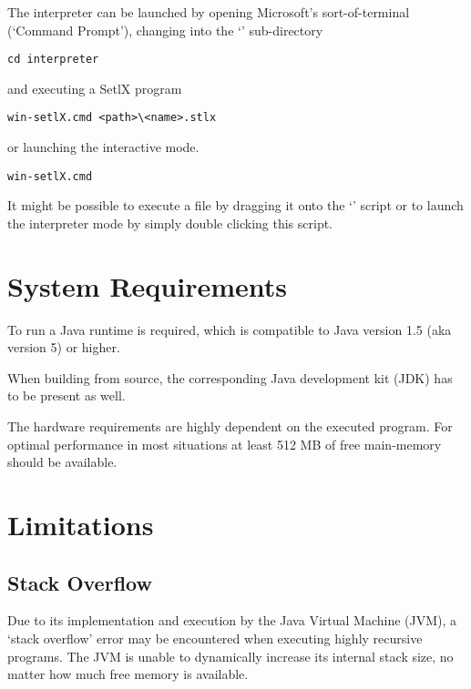 The \setlX{} interpreter can be launched by opening Microsoft's sort-of-terminal (`Command Prompt'), changing into the `' sub-directory

\begin{lstlisting}[frame=none,numbers=none]
cd interpreter
\end{lstlisting}

and executing a SetlX program

\begin{lstlisting}[frame=none,numbers=none]
win-setlX.cmd <path>\<name>.stlx
\end{lstlisting}

or launching the interactive mode.

\begin{lstlisting}[frame=none,numbers=none]
win-setlX.cmd
\end{lstlisting}

It might be possible to execute a \SetlX{} file by dragging it onto the `' script or to launch the interpreter mode by simply double clicking this script.

\section{System Requirements}

To run \setlX{} a Java runtime is required, which is compatible to Java version 1.5 (aka version 5) or higher.

When building from source, the corresponding Java development kit (JDK) has to be present as well.

The hardware requirements are highly dependent on the executed \SetlX{} program. For optimal performance in most situations at least 512 MB of free main-memory should be available.

\section{Limitations}

\subsection{Stack Overflow}

Due to its implementation and execution by the Java Virtual Machine (JVM), a `stack overflow' error may be encountered when executing highly recursive \SetlX{} programs. The JVM is unable to dynamically increase its internal stack size, no matter how much free memory is available.


